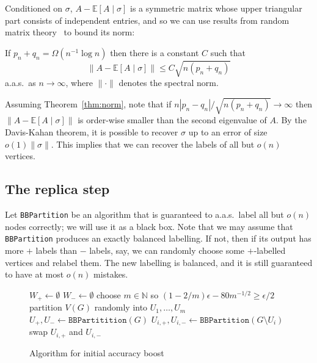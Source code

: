 \documentclass[EJP,final]{ejpecp}
\newcommand{\N}{\mathbb{N}}
\newcommand{\E}{\mathbb{E}}
\newcommand{\1}[1]{\mathbbm{1}_{\{#1\}}}
\newcommand{\symdiff}{\Delta}
\begin{document}
Conditioned on $\sigma$, $A - \E[A \mid \sigma]$ is a
symmetric matrix whose upper triangular part consists of independent entries, and so we can use results from random matrix
theory~\cite{Vu:07,Seginer:00} to bound its norm:
\begin{theorem}\label{thm:norm}
 If $p_n + q_n = \Omega(n^{-1} \log n)$ then there is a constant $C$ such that
 \[
  \|A - \E[A \mid \sigma]\| \le C \sqrt{n (p_n + q_n)}
 \]
 a.a.s.\ as $n \to \infty$, where $\|\cdot\|$ denotes the spectral
 norm.
\end{theorem}

Assuming Theorem~\ref{thm:norm}, note that if
$n|p_n - q_n|/\sqrt{n (p_n + q_n)} \to \infty$ then $\|A - \E[A \mid \sigma]\|$ is order-wise
smaller than the second eigenvalue of $A$. By the Davis-Kahan theorem, it is possible to
recover $\sigma$ up to an error of size $o(1) \|\sigma\|$. This implies that we can recover the labels
of all but $o(n)$ vertices.

\subsection{The replica step}\label{sec:first-step}

Let {\tt BBPartition} be an algorithm that is guaranteed to a.a.s.\ label all but $o(n)$ nodes correctly;
we will use it as a black box.
Note that we may assume that {\tt BBPartition} produces an exactly
balanced labelling. If not, then if its output has more $+$ labels
than $-$ labels, say, we can randomly choose some $+$-labelled vertices
and relabel them. The new labelling is balanced, and it is
still guaranteed to have at most $o(n)$ mistakes.

\begin{figure}
\begin{algorithm}[H]
 \LinesNumbered

 \BlankLine

 $W_+ \leftarrow \emptyset$\;
 $W_- \leftarrow \emptyset$\;
 choose $m \in \N$ so $(1-2/m) \epsilon - 80 m^{-1/2} \ge \epsilon/2$\;
 partition $V(G)$ randomly into $U_1, \dots, U_m$\;
 $U_+, U_- \leftarrow \mathtt{BBPartitition}(G)$\;
 \label{alg:first-initial-partition}
  {
  $U_{i,+}, U_{i,-} \leftarrow \mathtt{BBPartition}(G \setminus U_i)$\;
    \If{$|U_{i,+} \symdiff U_+| \ge n/2$ \label{alg:first-before-align}}
     {swap $U_{i,+}$ and $U_{i,-}$\; \label{alg:first-align} }
 }
\caption{Algorithm for initial accuracy boost}
\label{alg:first}
\end{algorithm}
\end{figure}
\end{document}
